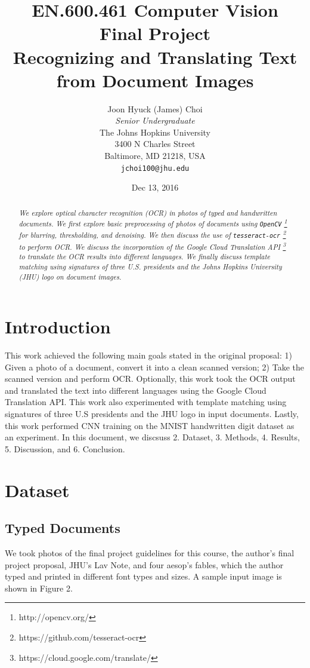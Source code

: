 \documentclass[11pt,letterpaper]{article}
\title{EN.600.461 Computer Vision\\Final Project\\Recognizing and Translating Text from Document Images}
\author{Joon Hyuck (James) Choi\\
  \textit{Senior Undergraduate}\\
  The Johns Hopkins University\\
  3400 N Charles Street\\
  Baltimore, MD 21218, USA\\
  {\tt jchoi100@jhu.edu}}
\date{Dec 13, 2016}
\begin{document}
\maketitle
\begin{abstract}

\textit{We explore optical character recognition (OCR) in photos of typed and handwritten documents. We first explore basic preprocessing of photos of documents using {\tt OpenCV} \footnote{http://opencv.org/} for blurring, thresholding, and denoising. We then discuss the use of {\tt tesseract-ocr} \footnote{https://github.com/tesseract-ocr} to perform OCR. We discuss the incorporation of the Google Cloud Translation API \footnote{https://cloud.google.com/translate/} to translate the OCR results into different languages. We finally discuss template matching using signatures of three U.S. presidents and the Johns Hopkins University (JHU) logo on document images.}
\end{abstract}

\section{Introduction}

This work achieved the following main goals stated in the original proposal: 1) Given a photo of a document, convert it into a clean scanned version; 2) Take the scanned version and perform OCR. Optionally, this work took the OCR output and translated the text into different languages using the Google Cloud Translation API. This work also experimented with template matching using signatures of three U.S presidents and the JHU logo in input documents. Lastly, this work performed CNN training on the MNIST handwritten digit dataset as an experiment. In this document, we discsuss 2. Dataset, 3. Methods, 4. Results, 5. Discussion, and 6. Conclusion.

\section{Dataset}

\subsection{Typed Documents}

We took photos of the final project guidelines for this course, the author's final project proposal, JHU's Lav Note, and four aesop's fables, which the author typed and printed in different font types and sizes. A sample input image is shown in Figure 2.
\end{document}
